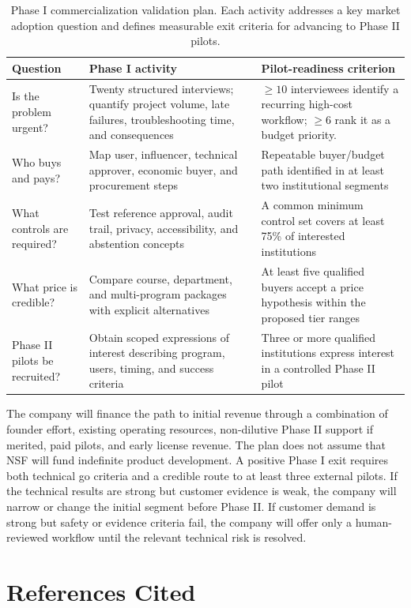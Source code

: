 \documentclass[11pt,letterpaper]{article}
\begin{document}
\begin{table}[H]
\centering
\scriptsize
\begin{tabularx}{\textwidth}{P{0.2\textwidth}YP{0.35\textwidth}}
\toprule
\textbf{Question} & \textbf{Phase I activity} & \textbf{Pilot-readiness criterion} \\
\midrule
Is the problem urgent? & Twenty structured interviews; quantify project volume, late failures, troubleshooting time, and consequences & $\geq10$ interviewees identify a recurring high-cost workflow; $\geq$6 rank it as a budget priority. \\
 Who buys and pays? & Map user, influencer, technical approver, economic buyer, and procurement steps & Repeatable buyer/budget path identified in at least two institutional segments \\
What controls are required? & Test reference approval, audit trail, privacy, accessibility, and abstention concepts & A common minimum control set covers at least 75\% of interested institutions \\
 What price is credible? & Compare course, department, and multi-program packages with explicit alternatives & At least five qualified buyers accept a price hypothesis within the proposed tier ranges \\
Phase II pilots be recruited? & Obtain scoped expressions of interest describing program, users, timing, and success criteria & Three or more qualified institutions express interest in a controlled Phase II pilot \\
\bottomrule
\end{tabularx}
\caption{Phase I commercialization validation plan. Each activity addresses a key market adoption question and defines measurable exit criteria for advancing to Phase II pilots.}
\label{tab:commercialtests}
\end{table}
\vspace{-10pt}

The company will finance the path to initial revenue through a combination of founder effort, existing operating resources, non-dilutive Phase II support if merited, paid pilots, and early license revenue. The plan does not assume that NSF will fund indefinite product development. A positive Phase I exit requires both technical go criteria and a credible route to at least three external pilots. If the technical results are strong but customer evidence is weak, the company will narrow or change the initial segment before Phase II. If customer demand is strong but safety or evidence criteria fail, the company will offer only a human-reviewed workflow until the relevant technical risk is resolved.

\newpage
\section*{References Cited}
\small
\printbibliography[heading=none]
\end{document}
